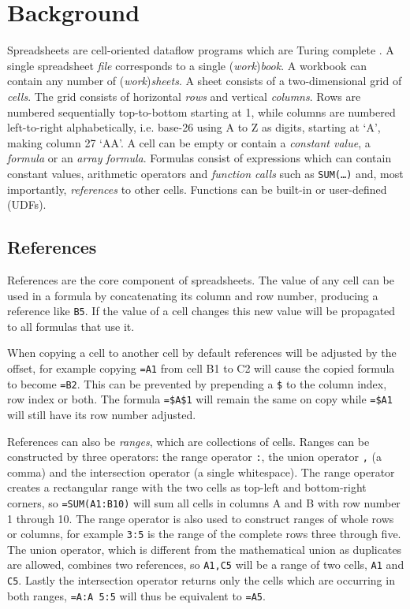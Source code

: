 \documentclass[conference]{IEEEtran}
\begin{document}
\section{Background}

Spreadsheets are cell-oriented dataflow programs which are Turing complete \cite{ExcelTuringComplete}.
A single spreadsheet \emph{file} corresponds to a single (\emph{work})\emph{book}.
A workbook can contain any number of (\emph{work})\emph{sheets}.
A sheet consists of a two-dimensional grid of \emph{cells}.
The grid consists of horizontal \emph{rows} and vertical \emph{columns}.
Rows are numbered sequentially top-to-bottom starting at 1, while columns are numbered left-to-right alphabetically, i.e. base-26 using A to Z as digits, starting at `A', making column 27 `AA'.
A cell can be empty or contain a \emph{constant value}, a \emph{formula} or an \emph{array formula}.
Formulas consist of expressions which can contain constant values, arithmetic operators and \emph{function calls} such as \texttt{SUM(\ldots)} and, most importantly, \emph{references} to other cells.
Functions can be built-in or user-defined (UDFs).

\subsection{References}
References are the core component of spreadsheets.
The value of any cell can be used in a formula by concatenating its column and row number, producing a reference like \texttt{B5}.
If the value of a cell changes this new value will be propagated to all formulas that use it.

When copying a cell to another cell by default references will be adjusted by the offset, for example copying \texttt{=A1} from cell B1 to C2 will cause the copied formula to become \texttt{=B2}.
This can be prevented by prepending a \texttt{\$} to the column index, row index or both.
The formula \texttt{=\$A\$1} will remain the same on copy while \texttt{=\$A1} will still have its row number adjusted.

References can also be \emph{ranges}, which are collections of cells.
Ranges can be constructed by three operators: the range operator \texttt{:}, the union operator \texttt{,} (a comma) and the intersection operator \texttt{} (a single whitespace).
The range operator creates a rectangular range with the two cells as top-left and bottom-right corners, so \texttt{=SUM(A1:B10)} will sum all cells in columns A and B with row number 1 through 10.
The range operator is also used to construct ranges of whole rows or columns, for example \texttt{3:5} is the range of the complete rows three through five.
The union operator, which is different from the mathematical union as duplicates are allowed, combines two references, so \texttt{A1,C5} will be a range of two cells, \texttt{A1} and \texttt{C5}.
Lastly the intersection operator returns only the cells which are occurring in both ranges, \texttt{=A:A 5:5} will thus be equivalent to \texttt{=A5}.
\end{document}
